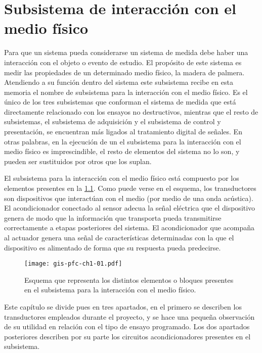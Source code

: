 \chapter{Subsistema de interacción con el medio físico}

Para que un sistema pueda considerarse un sistema de medida debe haber una
interacción con el objeto o evento de estudio. El propósito de este sistema
es medir las propiedades de un determinado medio físico, la madera de
palmera. Atendiendo a su función dentro del sistema este subsistema recibe
en esta memoria el nombre de subsistema para la interacción con el medio
físico. Es el único de los tres subsistemas que conforman el sistema de
medida que está directamente relacionado con los ensayos no destructivos,
mientras que el resto de subsistemas, el subsistema de adquisición y el
subsistema de control y presentación, se encuentran más ligados al
tratamiento digital de señales. En otras palabras, en la ejecución de un
 el subsistema para la interacción con el medio físico es
imprescindible, el resto de elementos del sistema no lo son, y pueden ser
sustituidos por otros que los suplan.

El subsistema para la interacción con el medio físico está compuesto por
los elementos presentes en la \cref{fig:submedium}. Como puede verse en el
esquema, los transductores son dispositivos que interactúan con el medio
(por medio de una onda acústica). El acondicionador conectado al sensor
adecua la señal eléctrica que el dispositivo genera de modo que la
información que transporta pueda transmitirse correctamente a etapas
posteriores del sistema. El acondicionador que acompaña al actuador genera
una señal de características determinadas con la que el dispositivo es
alimentado de forma que su respuesta pueda predecirse.

\begin{figure}
    \begin{center}
	\texttt{[image: gis-pfc-ch1-01.pdf]}
    \end{center}
    \caption[Subsistema para la interacción con el medio físico]{Esquema
    que representa los distintos elementos o bloques presentes en el
    subsistema para la interacción con el medio físico.}
    \label{fig:submedium}
\end{figure}

Este capítulo se divide pues en tres apartados, en el primero se describen
los transductores empleados durante el proyecto, y se hace una pequeña
observación de su utilidad en relación con el tipo de ensayo
programado. Los dos apartados posteriores describen por su parte los
circuitos acondicionadores presentes en el subsistema.

